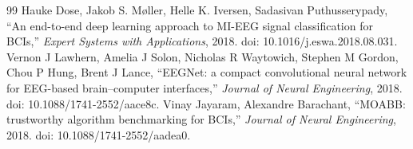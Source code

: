\begin{thebibliography}{99}
 Hauke Dose, Jakob S. M{\o}ller, Helle K. Iversen, Sadasivan Puthusserypady, ``An end-to-end deep learning approach to MI-EEG signal classification for BCIs,'' \emph{Expert Systems with Applications}, 2018. doi: 10.1016/j.eswa.2018.08.031.
 Vernon J Lawhern, Amelia J Solon, Nicholas R Waytowich, Stephen M Gordon, Chou P Hung, Brent J Lance, ``EEGNet: a compact convolutional neural network for EEG-based brain--computer interfaces,'' \emph{Journal of Neural Engineering}, 2018. doi: 10.1088/1741-2552/aace8c.
 Vinay Jayaram, Alexandre Barachant, ``MOABB: trustworthy algorithm benchmarking for BCIs,'' \emph{Journal of Neural Engineering}, 2018. doi: 10.1088/1741-2552/aadea0.
\end{thebibliography}
